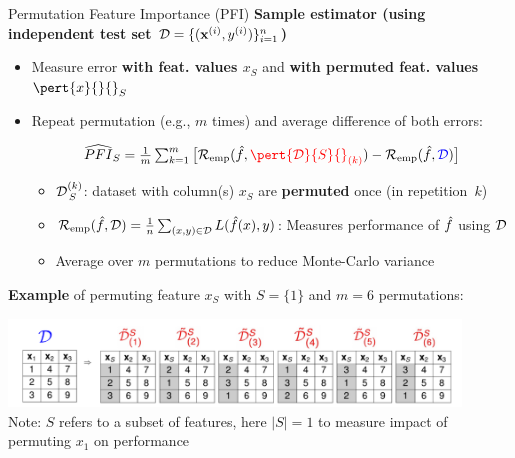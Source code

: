 \documentclass[10pt,compress,t,notes=noshow, xcolor=table]{beamer}
\begin{document}
\begin{frame}{Permutation Feature Importance (PFI) }
\textbf{Sample estimator (using independent test set $\mathcal{D}=\{(\mathbf{x}^{(i)},y^{(i)})\}_{i=1}^{n}$)}

\begin{itemize}
  \item Measure error {\color{blue}\textbf{with feat. values $x_S$}} and {\color{red}\textbf{with permuted feat. values $\pert{x}{}{}_S$}} 
  \item Repeat permutation (e.g., $m$ times) and average difference of both errors: 

$$
\widehat{PFI}_S = \tfrac{1}{m}  \textstyle\sum\nolimits_{k = 1}^{m} \big[ \riske (\fh, {\color{red}\pert{\D}{S}{}_{(k)}}) - \riske (\fh, {\color{blue}\D}) \big]
$$

\begin{itemize}
  \item $\mathcal{D}^{(k)}_{\,S}$: dataset with column(s) $x_S$ are \textbf{permuted} once (in repetition\ $k$)  
  \item $\mathcal{R}_{\text{emp}}(\hat{f}, \mathcal{D}) = \frac{1}{n} \sum\nolimits_{(x, y) \in \mathcal{D}}  L(\hat{f}(x), y)$: Measures performance of $\hat{f}$ using $\mathcal{D}$
  \item Average over $m$ permutations to reduce Monte-Carlo variance
\end{itemize}
\end{itemize}

\medskip

\textbf{Example} of permuting feature $x_S$ with $S = \{1\}$ and $m=6$ permutations:

\centering 
\includegraphics[width=0.9\textwidth]{figure_man/permuted-fv.pdf}\\
{\scriptsize
Note: $S$ refers to a subset of features, here $|S|=1$ to measure impact of permuting $x_1$ on performance
}
\end{frame}


\end{document}

